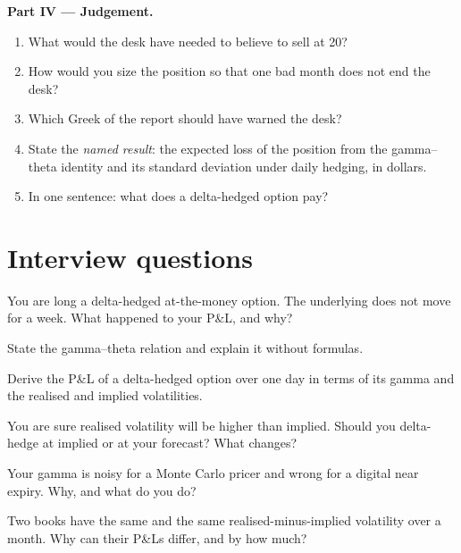 \begin{problem}
\medskip\noindent\textbf{Part IV --- Judgement.}
\begin{enumerate}[resume]
\item What would the desk have needed to believe to sell at 20?
\item How would you size the position so that one bad month does not end the desk?
\item Which Greek of the report should have warned the desk?
\item State the \emph{named result}: the expected loss of the position from the
gamma--theta identity and its standard deviation under daily hedging, in dollars.
\item In one sentence: what does a delta-hedged option pay?
\end{enumerate}
\end{problem}

\section{Interview questions}

\begin{interviewq}\label{iq:dv:greeks-and-the-hedging-pnl:1}
You are long a delta-hedged at-the-money option. The underlying does not move for
a week. What happened to your P\&L, and why?
\end{interviewq}

\begin{interviewq}\label{iq:dv:greeks-and-the-hedging-pnl:2}
State the gamma--theta relation and explain it without formulas.
\end{interviewq}

\begin{interviewq}\label{iq:dv:greeks-and-the-hedging-pnl:3}
Derive the P\&L of a delta-hedged option over one day in terms of its gamma and
the realised and implied volatilities.
\end{interviewq}

\begin{interviewq}\label{iq:dv:greeks-and-the-hedging-pnl:4}
You are sure realised volatility will be higher than implied. Should you delta-hedge
at implied or at your forecast? What changes?
\end{interviewq}

\begin{interviewq}\label{iq:dv:greeks-and-the-hedging-pnl:5}
Your  gamma is noisy for a Monte Carlo pricer and wrong for a
digital near expiry. Why, and what do you do?
\end{interviewq}

\begin{interviewq}\label{iq:dv:greeks-and-the-hedging-pnl:6}
Two books have the same  and the same realised-minus-implied volatility over a
month. Why can their P\&Ls differ, and by how much?
\end{interviewq}
